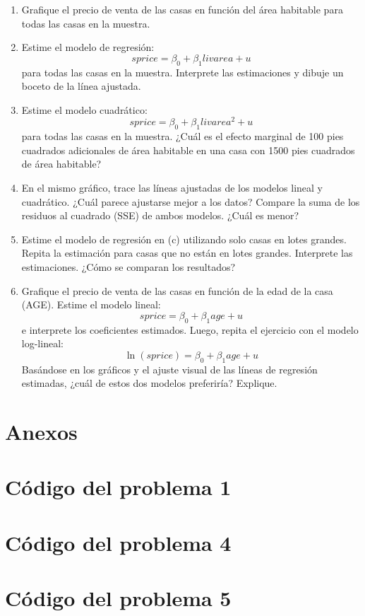 \documentclass[12pt]{article}
\begin{document}
\begin{enumerate}[label=\alph*)]
    \item Grafique el precio de venta de las casas en función del área habitable para todas las casas en la muestra.
    
    \item Estime el modelo de regresión: 
    \[
        sprice = \beta_0 + \beta_1 livarea + u
    \]
    para todas las casas en la muestra. Interprete las estimaciones y dibuje un boceto de la línea ajustada.
    
    \item Estime el modelo cuadrático:
    \[
        sprice = \beta_0 + \beta_1 livarea^2 + u
    \]
    para todas las casas en la muestra. ¿Cuál es el efecto marginal de 100 pies cuadrados adicionales de área habitable en una casa con 1500 pies cuadrados de área habitable?
    
    \item En el mismo gráfico, trace las líneas ajustadas de los modelos lineal y cuadrático. ¿Cuál parece ajustarse mejor a los datos? Compare la suma de los residuos al cuadrado (SSE) de ambos modelos. ¿Cuál es menor?
    
    \item Estime el modelo de regresión en (c) utilizando solo casas en lotes grandes. Repita la estimación para casas que no están en lotes grandes. Interprete las estimaciones. ¿Cómo se comparan los resultados?
    
    \item Grafique el precio de venta de las casas en función de la edad de la casa (AGE). Estime el modelo lineal:
    \[
        sprice = \beta_0 + \beta_1 age + u
    \]
    e interprete los coeficientes estimados. Luego, repita el ejercicio con el modelo log-lineal: 
    \[
        \ln(sprice) = \beta_0 + \beta_1 age + u
    \]
    Basándose en los gráficos y el ajuste visual de las líneas de regresión estimadas, ¿cuál de estos dos modelos preferiría? Explique.
\end{enumerate}

\appendix
\clearpage
\section*{\centering \Huge Anexos}

\section{Código del problema 1}

\newpage

\section{Código del problema 4}



\newpage

\section{Código del problema 5}
\end{document}
